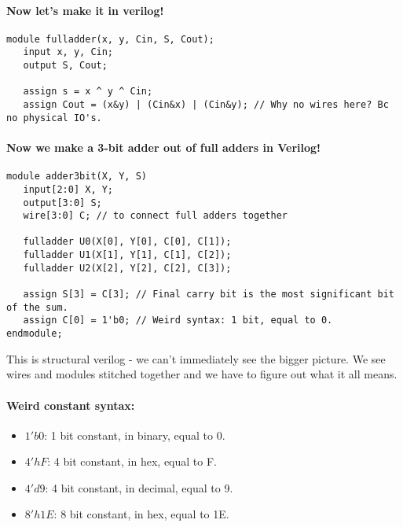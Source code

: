 \documentclass[a4paper,12pt]{report}
\begin{document}
\paragraph{Now let's make it in verilog!}
\begin{lstlisting}
module fulladder(x, y, Cin, S, Cout);
   input x, y, Cin;
   output S, Cout;

   assign s = x ^ y ^ Cin;
   assign Cout = (x&y) | (Cin&x) | (Cin&y); // Why no wires here? Bc no physical IO's.
\end{lstlisting}

\paragraph{Now we make a 3-bit adder out of full adders in Verilog!}
\begin{lstlisting}
module adder3bit(X, Y, S)
   input[2:0] X, Y;
   output[3:0] S;
   wire[3:0] C; // to connect full adders together

   fulladder U0(X[0], Y[0], C[0], C[1]);
   fulladder U1(X[1], Y[1], C[1], C[2]);
   fulladder U2(X[2], Y[2], C[2], C[3]);

   assign S[3] = C[3]; // Final carry bit is the most significant bit of the sum.
   assign C[0] = 1'b0; // Weird syntax: 1 bit, equal to 0.
endmodule;
\end{lstlisting}

This is structural verilog - we can't immediately see the bigger picture. We see wires and 
modules stitched together and we have to figure out what it all means.

\paragraph{Weird constant syntax: }
\begin{itemize}
\item $1'b0$: 1 bit constant, in binary, equal to 0.
\item $4'hF$: 4 bit constant, in hex, equal to F.
\item $4'd9$: 4 bit constant, in decimal, equal to 9.
\item $8'h1E$: 8 bit constant, in hex, equal to 1E.
\end{itemize}
\end{document}
